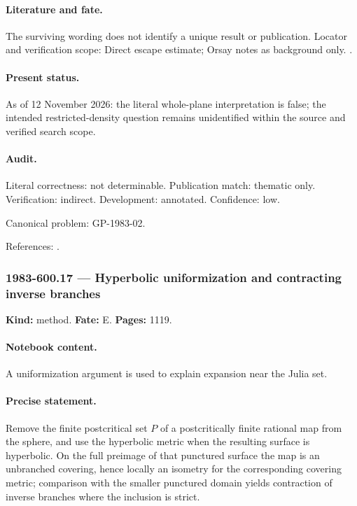 \paragraph{Literature and fate.} The surviving wording does not identify a unique result or publication. Locator and verification scope: Direct escape estimate; Orsay notes as background only. \cite{douadyhubbard1985polynomes}.

\paragraph{Present status.} As of 12 November 2026: the literal whole-plane interpretation is false; the intended restricted-density question remains unidentified within the source and verified search scope.

\paragraph{Audit.} Literal correctness: not determinable. Publication match: thematic only. Verification: indirect. Development: annotated. Confidence: low.

\noindent Canonical problem: GP-1983-02.\par

\noindent References: \citep{douadyhubbard1985polynomes}.\par

\subsubsection{1983-600.17 --- Hyperbolic uniformization and contracting inverse branches}

\label{item:1983-600.17}

\noindent\textbf{Kind:} method. \textbf{Fate:} E. \textbf{Pages:} 1119.\par

\paragraph{Notebook content.} A uniformization argument is used to explain expansion near the Julia set.

\paragraph{Precise statement.} Remove the finite postcritical set \(P\) of a postcritically finite rational map from the sphere, and use the hyperbolic metric when the resulting surface is hyperbolic. On the full preimage of that punctured surface the map is an unbranched covering, hence locally an isometry for the corresponding covering metric; comparison with the smaller punctured domain yields contraction of inverse branches where the inclusion is strict.

